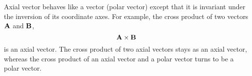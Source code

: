 \documentclass[12pt]{article}
\begin{document}
Axial vector behaves like a vector (polar vector) except that it is invariant under the inversion of its coordinate axes. For example, the cross product of two vectors $\bold{A}$ and $\bold{B}$, $$\bold{A}\times\bold{B}$$ is an axial vector. 
The cross product of two axial vectors stays as an axial vector, whereas the cross product of an axial vector and a polar vector turns to be a polar vector.
\end{document}
